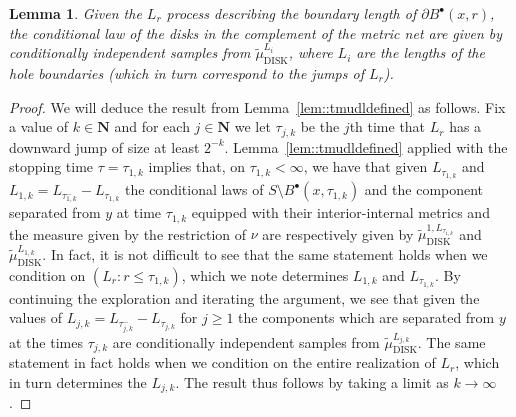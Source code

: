 \documentclass[10pt]{amsart}
\newcommand{\sbullet}{{\scriptscriptstyle\bullet}}
\theoremstyle{plain}
\numberwithin{theorem}{section}
\newtheorem{lemma}[theorem]{Lemma}
\theoremstyle{definition}
\newcommand{\N}{\mathbf{N}}
\def\tmudlset#1{\wt{\mu}_{\mathrm{DISK}}^{#1}}
\def\tmudonelset#1{\wt{\mu}_{ \mathrm{DISK}}^{1, #1}}
\let\wt\widetilde
\newcommand{\fb}[2]{B^\sbullet(#1,#2)}
\begin{document}
\begin{lemma}
\label{lem::explore_to_marked_point}
Given the $L_r$ process describing the boundary length of $\partial \fb{x}{r}$, the conditional law of the disks in the complement of the metric net are given by conditionally independent samples from $\tmudlset{L_i}$, where $L_i$ are the lengths of the hole boundaries (which in turn correspond to the jumps of $L_r$).
\end{lemma}
\begin{proof}
We will deduce the result from Lemma~\ref{lem::tmudldefined} as follows. Fix a value of $k \in \N$ and for each $j \in \N$ we let $\tau_{j,k}$ be the $j$th time that $L_r$ has a downward jump of size at least $2^{-k}$. Lemma~\ref{lem::tmudldefined} applied with the stopping time $\tau = \tau_{1,k}$ implies that, on $\tau_{1,k} < \infty$, we have that given $L_{\tau_{1,k}}$ and $L_{1,k} = L_{\tau_{1,k}^-} - L_{\tau_{1,k}}$ the conditional laws of $S \setminus \fb{x}{\tau_{1,k}}$ and the component separated from $y$ at time $\tau_{1,k}$ equipped with their interior-internal metrics and the measure given by the restriction of $\nu$ are respectively given by $\tmudonelset{L_{\tau_{1,k}}}$ and $\tmudlset{L_{1,k}}$. In fact, it is not difficult to see that the same statement holds when we condition on $(L_r : r \leq \tau_{1,k})$, which we note determines $L_{1,k}$ and $L_{\tau_{1,k}}$. By continuing the exploration and iterating the argument, we see that given the values of $L_{j,k} = L_{\tau_{j,k}^-} - L_{\tau_{j,k}}$ for $j \geq 1$ the components which are separated from $y$ at the times $\tau_{j,k}$ are conditionally independent samples from $\tmudlset{L_{j,k}}$. The same statement in fact holds when we condition on the entire realization of $L_r$, which in turn determines the $L_{j,k}$. The result thus follows by taking a limit as $k \to \infty$.
\end{proof}
\end{document}
